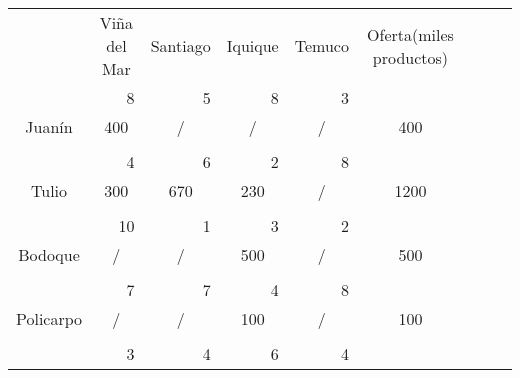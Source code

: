 \documentclass[12pt,letterpaper]{article}
\begin{document}
\begin{center}
\begin{tabular}{ccc|ccc|ccc|ccc|ccc|ccc|ccc}
\multicolumn{3}{c|}{} & \multicolumn{3}{c}{Viña del Mar} & \multicolumn{3}{c}{Santiago} & \multicolumn{3}{c}{Iquique} & \multicolumn{3}{c|}{Temuco} & \multicolumn{3}{c}{Oferta(miles productos)}\\
\cline{1-15}
\multicolumn{3}{c|}{} & \multicolumn{3}{r|}{8} & \multicolumn{3}{r|}{5} & \multicolumn{3}{r|}{8} & \multicolumn{3}{r|}{3} \\
\multicolumn{3}{c|}{Juanín} & \multicolumn{3}{c|}{400} & \multicolumn{3}{c|}{/} & \multicolumn{3}{c|}{/} & \multicolumn{3}{c|}{/}& \multicolumn{3}{c}{400}\\
\multicolumn{3}{c|}{} & \multicolumn{3}{c|}{} & \multicolumn{3}{c|}{} & \multicolumn{3}{c|}{} & \multicolumn{3}{c|}{}\\
\cline{1-15}
\multicolumn{3}{c|}{} & \multicolumn{3}{r|}{4} & \multicolumn{3}{r|}{6} & \multicolumn{3}{r|}{2} & \multicolumn{3}{r|}{8} \\
\multicolumn{3}{c|}{Tulio} & \multicolumn{3}{c|}{300} & \multicolumn{3}{c|}{670} & \multicolumn{3}{c|}{230} & \multicolumn{3}{c|}{/}& \multicolumn{3}{c}{1200}\\
\multicolumn{3}{c|}{} & \multicolumn{3}{c|}{} & \multicolumn{3}{c|}{} & \multicolumn{3}{c|}{} & \multicolumn{3}{c|}{}\\
\cline{1-15}
\multicolumn{3}{c|}{} & \multicolumn{3}{r|}{10} & \multicolumn{3}{r|}{1} & \multicolumn{3}{r|}{3} & \multicolumn{3}{r|}{2} \\
\multicolumn{3}{c|}{Bodoque} & \multicolumn{3}{c|}{/} & \multicolumn{3}{c|}{/} & \multicolumn{3}{c|}{500} & \multicolumn{3}{c|}{/}& \multicolumn{3}{c}{500}\\
\multicolumn{3}{c|}{} & \multicolumn{3}{c|}{} & \multicolumn{3}{c|}{} & \multicolumn{3}{c|}{} & \multicolumn{3}{c|}{}\\
\cline{1-15}
\multicolumn{3}{c|}{} & \multicolumn{3}{r|}{7} & \multicolumn{3}{r|}{7} & \multicolumn{3}{r|}{4} & \multicolumn{3}{r|}{8} \\
\multicolumn{3}{c|}{Policarpo} & \multicolumn{3}{c|}{/} & \multicolumn{3}{c|}{/} & \multicolumn{3}{c|}{100} & \multicolumn{3}{c|}{/}& \multicolumn{3}{c}{100}\\
\multicolumn{3}{c|}{} & \multicolumn{3}{c|}{} & \multicolumn{3}{c|}{} & \multicolumn{3}{c|}{} & \multicolumn{3}{c|}{}\\
\cline{1-15}
\multicolumn{3}{c|}{} & \multicolumn{3}{r|}{3} & \multicolumn{3}{r|}{4} & \multicolumn{3}{r|}{6} & \multicolumn{3}{r|}{4} \\

\end{tabular}
\end{center}
\end{document}
